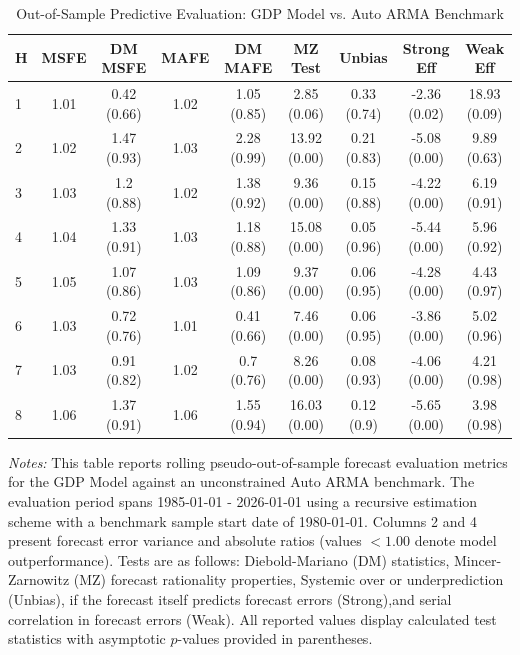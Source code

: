 \begin{table}[htbp]
\centering
\caption{Out-of-Sample Predictive Evaluation: GDP Model vs. Auto ARMA Benchmark}
\label{tab:gdp_model_evaluation}
\footnotesize
\begin{tabular}{l cccccccc}
\hline\hline
\rule{0pt}{3ex}
\textbf{H} & \textbf{MSFE} & \textbf{DM MSFE} & \textbf{MAFE} & \textbf{DM MAFE} & \textbf{MZ Test} & \textbf{Unbias} & \textbf{Strong Eff} & \textbf{Weak Eff} \\[0.5ex]
\hline
\rule{0pt}{2.5ex}
1 & 1.01 & 0.42 (0.66) & 1.02 & 1.05 (0.85) & 2.85 (0.06) & 0.33 (0.74) & -2.36 (0.02) & 18.93 (0.09) \\
2 & 1.02 & 1.47 (0.93) & 1.03 & 2.28 (0.99) & 13.92 (0.00) & 0.21 (0.83) & -5.08 (0.00) & 9.89 (0.63) \\
3 & 1.03 & 1.2 (0.88) & 1.02 & 1.38 (0.92) & 9.36 (0.00) & 0.15 (0.88) & -4.22 (0.00) & 6.19 (0.91) \\
4 & 1.04 & 1.33 (0.91) & 1.03 & 1.18 (0.88) & 15.08 (0.00) & 0.05 (0.96) & -5.44 (0.00) & 5.96 (0.92) \\
5 & 1.05 & 1.07 (0.86) & 1.03 & 1.09 (0.86) & 9.37 (0.00) & 0.06 (0.95) & -4.28 (0.00) & 4.43 (0.97) \\
6 & 1.03 & 0.72 (0.76) & 1.01 & 0.41 (0.66) & 7.46 (0.00) & 0.06 (0.95) & -3.86 (0.00) & 5.02 (0.96) \\
7 & 1.03 & 0.91 (0.82) & 1.02 & 0.7 (0.76) & 8.26 (0.00) & 0.08 (0.93) & -4.06 (0.00) & 4.21 (0.98) \\
8 & 1.06 & 1.37 (0.91) & 1.06 & 1.55 (0.94) & 16.03 (0.00) & 0.12 (0.9) & -5.65 (0.00) & 3.98 (0.98) \\
\hline\hline
\end{tabular}%
\par\smallskip
\parbox{\textwidth}{\scriptsize \textit{Notes:} This table reports rolling pseudo-out-of-sample forecast evaluation metrics for the GDP Model against an unconstrained Auto ARMA benchmark. The evaluation period spans 1985-01-01 - 2026-01-01 using a recursive estimation scheme with a benchmark sample start date of 1980-01-01. Columns 2 and 4 present forecast error variance and absolute ratios (values $< 1.00$ denote model outperformance). Tests are as follows: Diebold-Mariano (DM) statistics, Mincer-Zarnowitz (MZ) forecast rationality properties, Systemic over or underprediction (Unbias), if the forecast itself predicts forecast errors (Strong),and serial correlation in forecast errors (Weak). All reported values display calculated test statistics with asymptotic $p$-values provided in parentheses.}
\end{table}
